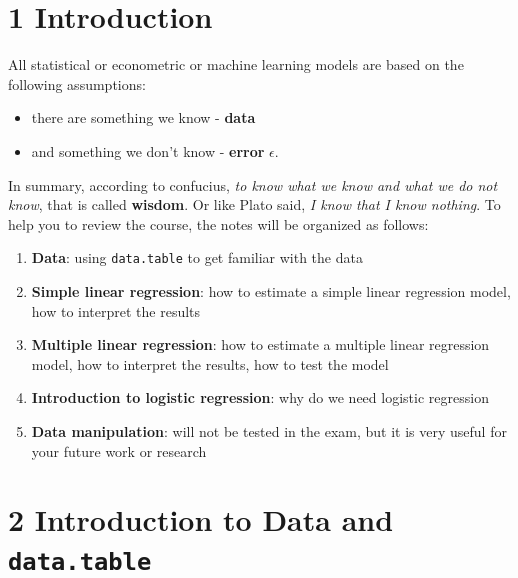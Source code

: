 \documentclass[11pt]{article}
\theoremstyle{definition}
\providecommand{\tightlist}{%
\setlength{\itemsep}{0pt}\setlength{\parskip}{0pt}}
\begin{document}
\vskip -8.5pt


\noindent  

\hypersetup{linkcolor=black}
\setcounter{tocdepth}{3}
\tableofcontents


\newpage
{}
\setcounter{page}{1}
\section{1 Introduction}

All statistical or econometric or machine learning models are based on 
the following assumptions:

\begin{itemize}
\tightlist
\item there are something we know - \textbf{data}
\item and something we don't know - \textbf{error} \(\epsilon\).
\end{itemize}

In summary, according to confucius, \textit{to know what we know and what we do not know}, 
that is called \textbf{wisdom}. Or like Plato said, \textit{I know that I know nothing}.
To help you to review the course, the notes will be organized as follows:

\begin{enumerate}
\tightlist 
  \item \textbf{Data}: using \texttt{data.table} to get familiar with the data
  \item \textbf{Simple linear regression}: how to estimate a simple linear regression model, how to interpret the results
  \item \textbf{Multiple linear regression}: how to estimate a multiple linear regression model, how to interpret the results, how to test the model
  \item \textbf{Introduction to logistic regression}: why do we need logistic regression
  \item \textbf{Data manipulation}: will not be tested in the exam, but it is very useful for your future work or research
\end{enumerate}


\section{2 Introduction to Data and \texttt{data.table}}
\end{document}
